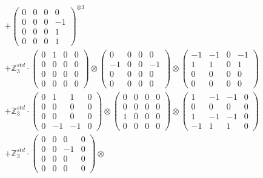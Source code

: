 \documentclass{article}
\begin{document}
{\begin{align}
        &+ \label{Rs16-Rc11-Solution-4-c16} \begin{pmatrix} 0 & 0 & 0 & 0 \\ 0 & 0 & 0 & -1 \\ 0 & 0 & 0 & 1 \\ 0 & 0 & 0 & 1 \end{pmatrix}^{\otimes 3} \\
        &+ \label{Rs16-Rc11-Solution-4-c17} \mathbb{Z}_3^{std} \cdot 
            \begin{pmatrix} 0 & 1 & 0 & 0 \\ 0 & 0 & 0 & 0 \\ 0 & 0 & 0 & 0 \\ 0 & 0 & 0 & 0 \end{pmatrix} \otimes 
            \begin{pmatrix} 0 & 0 & 0 & 0 \\ -1 & 0 & 0 & -1 \\ 0 & 0 & 0 & 0 \\ 0 & 0 & 0 & 0 \end{pmatrix} \otimes 
            \begin{pmatrix} -1 & -1 & 0 & -1 \\ 1 & 1 & 0 & 1 \\ 0 & 0 & 0 & 0 \\ 0 & 0 & 0 & 0 \end{pmatrix} \\ 
        &+ \label{Rs16-Rc11-Solution-4-c18} \mathbb{Z}_3^{std} \cdot 
            \begin{pmatrix} 0 & 1 & 1 & 0 \\ 0 & 0 & 0 & 0 \\ 0 & 0 & 0 & 0 \\ 0 & -1 & -1 & 0 \end{pmatrix} \otimes 
            \begin{pmatrix} 0 & 0 & 0 & 0 \\ 0 & 0 & 0 & 0 \\ 1 & 0 & 0 & 0 \\ 0 & 0 & 0 & 0 \end{pmatrix} \otimes 
            \begin{pmatrix} 1 & -1 & -1 & 0 \\ 0 & 0 & 0 & 0 \\ 1 & -1 & -1 & 0 \\ -1 & 1 & 1 & 0 \end{pmatrix} \\ 
        &+ \label{Rs16-Rc11-Solution-4-c19} \mathbb{Z}_3^{std} \cdot 
            \begin{pmatrix} 0 & 0 & 0 & 0 \\ 0 & 0 & -1 & 0 \\ 0 & 0 & 0 & 0 \\ 0 & 0 & 0 & 0 \end{pmatrix} \otimes 

\end{align}}
\end{document}
